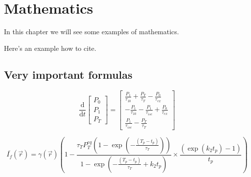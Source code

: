 \chapter{Mathematics}
In this chapter we will see some examples of mathematics.

Here's an example how to cite.~\citep{atc13}

\lipsum[1]

\section{Very important formulas}
\lipsum[2]

\begin{equation}\label{eqn:rate_eqns}
\frac{\textrm{d}}{\textrm{d}t}\left[
\begin{array}{l}
P_{\textit{0}} \\
P_{\textit{1}} \\
P_{\textit{T}}
\end{array}
\right] =
\left[
\begin{array}{l}
\frac{P_{\textit{1}}}{\tau_{\textit{10}}} + \frac{P_{\textit{T}}}{\tau_{\textit{T}}} - \frac{P_{\textit{0}}}{\tau_{\textit{ex}}} \\
- \frac{P_{\textit{1}}}{\tau_{\textit{10}}} - \frac{P_{\textit{1}}}{\tau_{isc}} + \frac{P_{\textit{0}}}{\tau_{\textit{ex}}} \\
\frac{P_{\textit{1}}}{\tau_{isc}} -  \frac{P_{\textit{T}}}{\tau_{\textit{T}}}
\end{array}
\right]
\end{equation}

\lipsum[3]


\begin{equation}\label{eqn:avgfluorescence}
\bar{I_{f}}(\vec{r})
	= \gamma(\vec{r}) \left(1 - \frac{\tau_{\textit{T}} P_{\textit{T}}^{{eq}}\left(1-\exp \left(-\frac{(T_p - t_p)}{\tau_{\textit{T}}}\right)\right)}{1-\exp\left(-\frac{(T_p - t_p)}{\tau_{\textit{T}}} + k_{\textit{2}} t_p\right)} \times \frac{\left(\exp\left(k_{\textit{2}} t_p\right)-1\right)}{t_p} \right)
\end{equation}

\lipsum[3]
